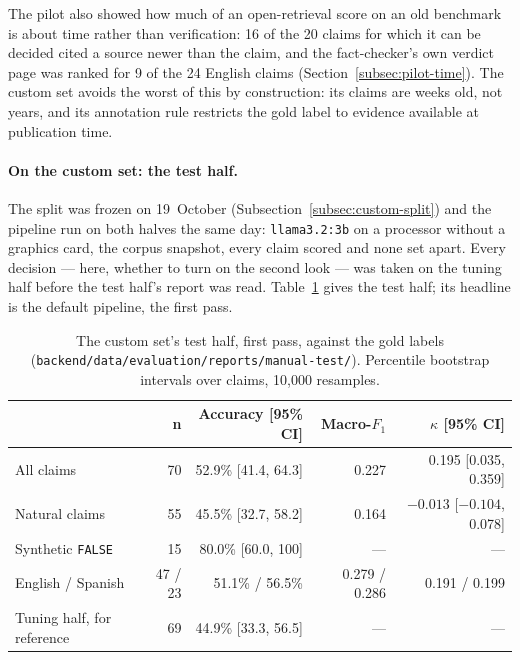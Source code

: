 The pilot also showed how much of an open-retrieval score on an old
benchmark is about time rather than verification: 16 of the 20 claims
for which it can be decided cited a source newer than the claim, and
the fact-checker's own verdict page was ranked for 9 of the 24 English
claims (Section~\ref{subsec:pilot-time}). The custom set avoids the
worst of this by construction: its claims are weeks old, not years, and
its annotation rule restricts the gold label to evidence available at
publication time.

\paragraph{On the custom set: the test half.} The split was frozen on
19~October (Subsection~\ref{subsec:custom-split}) and the pipeline run on
both halves the same day: \texttt{llama3.2:3b} on a processor without a
graphics card, the corpus snapshot, every claim scored and none set
apart. Every decision --- here, whether to turn on the second look --- was
taken on the tuning half before the test half's report was read.
Table~\ref{tab:custom-test} gives the test half; its headline is the
default pipeline, the first pass.

\begin{table}[ht]
\centering
\small
\begin{tabular}{@{}lrrrr@{}}
\toprule
& \textbf{n} & \textbf{Accuracy [95\% CI]} & \textbf{Macro-$F_1$} & \textbf{$\kappa$ [95\% CI]} \\
\midrule
All claims        & 70 & 52.9\% [41.4, 64.3] & 0.227 & 0.195 [0.035, 0.359] \\
Natural claims    & 55 & 45.5\% [32.7, 58.2] & 0.164 & $-0.013$ [$-0.104$, 0.078] \\
Synthetic \texttt{FALSE} & 15 & 80.0\% [60.0, 100] & --- & --- \\
English / Spanish & 47 / 23 & 51.1\% / 56.5\% & 0.279 / 0.286 & 0.191 / 0.199 \\
\midrule
Tuning half, for reference & 69 & 44.9\% [33.3, 56.5] & --- & --- \\
\bottomrule
\end{tabular}
\caption[The custom set's test half, first pass]{The custom set's test half, first pass, against the gold labels
(\texttt{backend/data/evaluation/reports/manual-test/}). Percentile
bootstrap intervals over claims, 10{,}000 resamples.}
\label{tab:custom-test}
\end{table}

